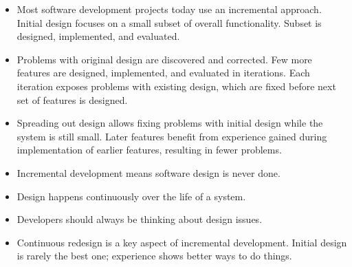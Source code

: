 { 
	
	
	\begin{itemize}
		\item Most software development projects today use an incremental approach.
		Initial design focuses on a small subset of overall functionality. Subset is designed, implemented, and evaluated.
		
		\item	Problems with original design are discovered and corrected. Few more features are designed, implemented, and evaluated in iterations. Each iteration exposes problems with existing design, which are fixed before next set of features is designed.
		
		\item	Spreading out design allows fixing problems with initial design while the system is still small. Later features benefit from experience gained during implementation of earlier features, resulting in fewer problems.
		
		
		
	\end{itemize}
}
{ 
	
	
	\begin{itemize}
		\item Incremental development means software design is never done.
		
	\item	Design happens continuously over the life of a system.
		
	\item	Developers should always be thinking about design issues.
		
	\item	Continuous redesign is a key aspect of incremental development. Initial design is rarely the best one; experience shows better ways to do things.
		
		 
		
	\end{itemize}
}


